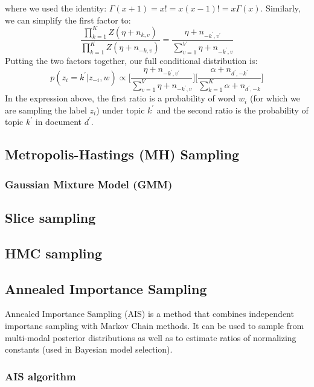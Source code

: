 where we used the identity: $\Gamma(x+1) = x! = x(x-1)! = x\Gamma(x)$. Similarly, we can simplify the first factor to:
\begin{equation}
    \frac{\prod_{k=1}^{K}Z(\eta + n_{k,v})}{\prod_{k=1}^{K}Z(\eta + n_{-k,v})} = \frac{\eta + n_{-k^{\prime}, v^{\prime}}}{\sum_{v=1}^{V}\eta + n_{-k^{\prime}, v}}
\end{equation}
Putting the two factors together, our full conditional distribution is:
\begin{equation}
    p(z_i = k^{\prime}|z_{-i}, w) \propto \bigg[ \frac{\eta + n_{-k^{\prime},v^{\prime}}}{\sum_{v=1}^{V}\eta + n_{-k^{\prime}, v}} \bigg] \bigg[\frac{\alpha + n_{d^{\prime}, -k^{\prime}}}{\sum_{k=1}^{K}\alpha + n_{d^{\prime},-k}} \bigg]
\end{equation}
In the expression above, the first ratio is a probability of word $w_i$ (for which we are sampling the label $z_i$) under topic $k^{\prime}$ and the second ratio is the probability of topic $k^{\prime}$ in document $d^{\prime}$. 

\subsection{Metropolis-Hastings (MH) Sampling}
\subsubsection{Gaussian Mixture Model (GMM)}

\subsection{Slice sampling}
\subsection{HMC sampling}

\subsection{Annealed Importance Sampling}
Annealed Importance Sampling (AIS) is a method that combines independent importanc sampling with Markov Chain methods. It can be used to sample from multi-modal posterior distributions as well as to estimate ratios of normalizing constants (used in Bayesian model selection).

\subsubsection{AIS algorithm}

